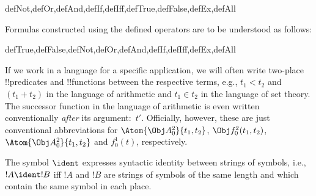 \documentclass[../../../include/open-logic-section]{subfiles}
\begin{document}
\begin{tagblock}{defNot,defOr,defAnd,defIf,defIff,defTrue,defFalse,defEx,defAll}
\begin{defn}
Formulas constructed using the defined operators are to be understood
as follows:

\begin{tagenumerate}{defTrue,defFalse,defNot,defOr,defAnd,defIf,defIff,defEx,defAll}









\end{tagenumerate}
\end{defn}
\end{tagblock}

If we work in a language for a specific application, we will often
write two-place !!{predicate}s and !!{function}s between the
respective terms, e.g., $t_1 < t_2$ and $(t_1 + t_2)$ in the language
of arithmetic and $t_1 \in t_2$ in the language of set theory.  The
successor function in the language of arithmetic is even written
conventionally \emph{after} its argument:~$t'$.  Officially, however,
these are just conventional abbreviations for $\Atom{\Obj A^2_0}{t_1, t_2}$,
$\Obj f^2_0(t_1, t_2)$, $\Atom{\Obj A^2_0}{t_1, t_2}$ and $f^1_0(t)$,
respectively.

\begin{defn}
The symbol $\ident$ expresses syntactic identity between strings of
symbols, i.e., $!A \ident !B$ iff $!A$ and $!B$ are strings of symbols
of the same length and which contain the same symbol in each place.
\end{defn}
\end{document}
